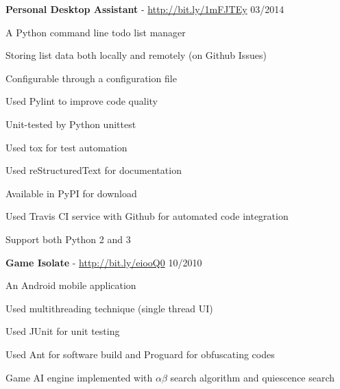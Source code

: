\documentclass[margin,line]{resume}
\begin{document}
\begin{resume}
    \textbf{Personal Desktop Assistant} - \url{http://bit.ly/1mFJTEy} \hfill 03/2014 \vspace{-3mm}\\\vspace{-1mm}%
      \begin{list2}
       \item A Python command line todo list manager
       \item Storing list data both locally and remotely (on Github Issues)
       \item Configurable through a configuration file
       \item Used Pylint to improve code quality
       \item Unit-tested by Python unittest
       \item Used tox for test automation
       \item Used reStructuredText for documentation
       \item Available in PyPI for download
       \item Used Travis CI service with Github for automated code integration
       \item Support both Python 2 and 3
      \end{list2}

    \textbf{Game Isolate} - \url{http://bit.ly/eiooQ0} \hfill 10/2010 \vspace{-3mm}\\\vspace{-1mm}%
      \begin{list2}
       \item An Android mobile application
       \item Used multithreading technique (single thread UI)
       \item Used JUnit for unit testing
       \item Used Ant for software build and Proguard for obfuscating codes
       \item Game AI engine implemented with $\alpha \beta$ search algorithm and quiescence search
      \end{list2}
\end{resume}
\end{document}
